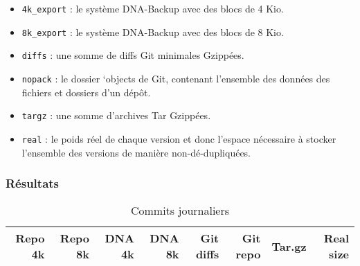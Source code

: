 \documentclass[a4paper,twocolumn]{article}
\begin{document}
\begin{itemize}
\item
  \verb|4k_export| : le système DNA-Backup avec des blocs de 4 Kio.
\item
  \verb|8k_export| : le système DNA-Backup avec des blocs de 8 Kio.
\item
  \verb|diffs| : une somme de diffs Git minimales Gzippées.
\item
  \verb|nopack| : le dossier `objects de Git, contenant l'ensemble des
  données des fichiers et dossiers d'un dépôt.
\item
  \verb|targz| : une somme d'archives Tar Gzippées.
\item
  \verb|real| : le poids réel de chaque version et donc l'espace
  nécessaire à stocker l'ensemble des versions de manière
  non-dé-dupliquées.
\end{itemize}

\subsubsection{Résultats}


\begin{table*}[ht]
\centering
\begin{tabularx}{\textwidth}{RRRRRRRR}
\textbf{Repo 4k} &
\textbf{Repo 8k} &
\textbf{DNA 4k} &
\textbf{DNA 8k} &
\textbf{Git diffs} &
\textbf{Git repo} &
\textbf{Tar.gz} &
\textbf{Real size} \\
\hline

\end{tabularx}
\caption{Commits journaliers}
\label{tab:commits-daily}
\end{table*}
\end{document}
